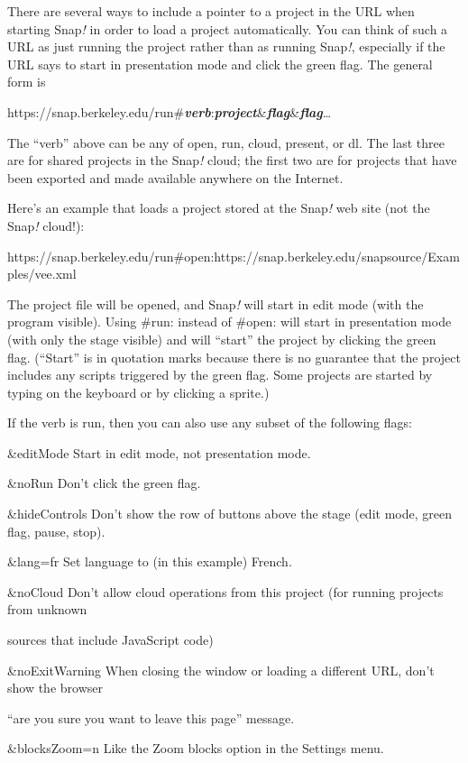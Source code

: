There are several ways to include a pointer to a project in the URL when
starting Snap\emph{!} in order to load a project automatically. You can
think of such a URL as just running the project rather than as running
Snap\emph{!}, especially if the URL says to start in presentation mode
and click the green flag. The general form is

https://snap.berkeley.edu/run\#\emph{\textbf{verb}}:\emph{\textbf{project}}\&\emph{\textbf{flag}}\&\emph{\textbf{flag}}\ldots{}

The ``verb'' above can be any of open, run, cloud, present, or dl. The
last three are for shared projects in the Snap\emph{!} cloud; the first
two are for projects that have been exported and made available anywhere
on the Internet.

Here's an example that loads a project stored at the Snap\emph{!} web
site (not the Snap\emph{!} cloud!):

https://snap.berkeley.edu/run\#open:https://snap.berkeley.edu/snapsource/Examples/vee.xml

The project file will be opened, and Snap\emph{!} will start in edit
mode (with the program visible). Using \#run: instead of \#open: will
start in presentation mode (with only the stage visible) and will
``start'' the project by clicking the green flag. (``Start'' is in
quotation marks because there is no guarantee that the project includes
any scripts triggered by the green flag. Some projects are started by
typing on the keyboard or by clicking a sprite.)

If the verb is run, then you can also use any subset of the following
flags:

\&editMode Start in edit mode, not presentation mode.

\&noRun Don't click the green flag.

\&hideControls Don't show the row of buttons above the stage (edit mode,
green flag, pause, stop).

\&lang=fr Set language to (in this example) French.

\&noCloud Don't allow cloud operations from this project (for running
projects from unknown

sources that include JavaScript code)

\&noExitWarning When closing the window or loading a different URL,
don't show the browser

``are you sure you want to leave this page'' message.

\&blocksZoom=n Like the Zoom blocks option in the Settings menu.


